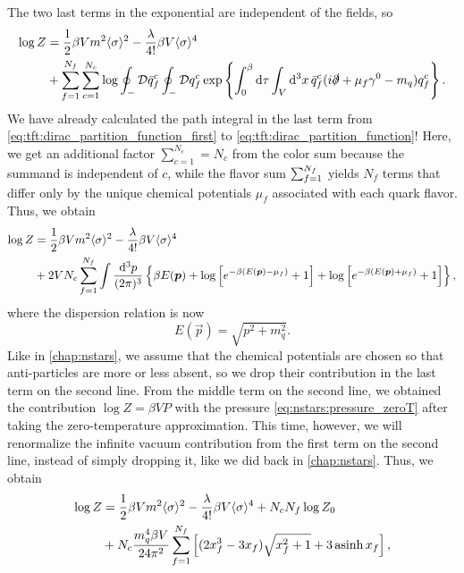 The two last terms in the exponential are independent of the fields, so
\begin{equation}
\begin{split}
	\log Z &= \frac12 \beta V m^2 \langle \sigma \rangle^2 - \frac{\lambda}{4!} \beta V \langle \sigma \rangle^4 \\
	       &+ \sum_{f=1}^{N_f} \sum_{c=1}^{N_c} \log \oint_- \mathcal{D} \bar{q}_f^c \oint_- \mathcal{D} q_f^c \exp \left\{ \int_0^\beta \mathop{}\!\mathrm{d} \tau \int_V \mathop{}\!\mathrm{d}^3 x \, \bar{q}_f^c (i \slashed\partial + \mu_f \gamma^0 - m_q) q_f^c \right\} .
\end{split}
\end{equation}
We have already calculated the path integral in the last term from \cref{eq:tft:dirac_partition_function_first} to \cref{eq:tft:dirac_partition_function}!
Here, we get an additional factor $\sum_{c=1}^{N_c} = N_c$ from the color sum because the summand is independent of $c$,
while the flavor sum $\sum_{f=1}^{\smash{N_f}}$ yields $N_f$ terms that differ only by the unique chemical potentials $\mu_f$ associated with each quark flavor. 
Thus, we obtain
\begin{equation}
\begin{split}
	\log Z &= \frac12 \beta V m^2 \langle \sigma \rangle^2 - \frac{\lambda}{4!} \beta V \langle \sigma \rangle^4 \\
	       &+ 2 V N_c \sum_{f=1}^{N_f} \int \frac{\mathop{}\!\mathrm{d}^3 p}{(2 \pi)^3} \left\{ \beta E({\bm{p}}) + \log \left[ e^{-\beta (E({\bm{p}}) - \mu_f)}+1 \right] + \log \left[ e^{-\beta (E({\bm{p}}) + \mu_f)} + 1\right] \right\} ,
\end{split}
\label{eq:lsm:potential_divergent_logz0}
\end{equation}
where the dispersion relation is now
\begin{equation}
	E(\vec{p}) = \sqrt{p^2 + m_q^2} .
\end{equation}
Like in \cref{chap:nstars}, we assume that the chemical potentials are chosen so that anti-particles are more or less absent, so we drop their contribution in the last term on the second line.
From the middle term on the second line, we obtained the contribution $\log Z = \beta V P$ with the pressure \eqref{eq:nstars:pressure_zeroT} after taking the zero-temperature approximation.
This time, however, we will renormalize the infinite vacuum contribution from the first term on the second line, instead of simply dropping it, like we did back in \cref{chap:nstars}.
Thus, we obtain
\begin{equation}
\begin{split}
	\log Z &= \frac12 \beta V m^2 \langle \sigma \rangle^2 - \frac{\lambda}{4!} \beta V \langle \sigma \rangle^4 + N_c N_f \log Z_0 \\
	       &+ N_c \frac{m_q^4 \beta V}{24 \pi^2} \sum_{f=1}^{N_f} \left[ (2 x_f^3 - 3x_f) \sqrt{x_f^2 + 1} + 3 \operatorname{asinh} x_f \right],
\end{split}
\end{equation}
